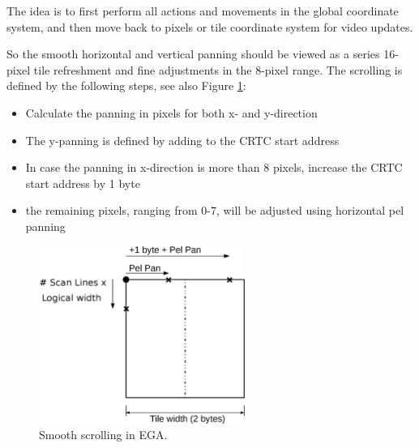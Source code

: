 \documentclass[book.tex]{subfiles}
\begin{document}
The idea is to first perform all actions and movements in the global coordinate system, and then move back to pixels or tile coordinate system for video updates. \\
\begin{minipage}{\textwidth}
  
  \end{minipage}
  \label{ega_refresh}
  \par


So the smooth horizontal and vertical panning should be viewed as a series 16-pixel tile refreshment and fine adjustments in the 8-pixel range. The scrolling is defined by the following steps, see also Figure \ref{fig:tile_refresh}:
\begin{itemize}
  \item Calculate the panning in pixels for both x- and y-direction
  \item The y-panning is defined by adding  to the CRTC start address
  \item In case the panning in x-direction is more than 8 pixels, increase the CRTC start address by 1 byte
  \item the remaining pixels, ranging from 0-7, will be adjusted using horizontal pel panning
\end{itemize}


\begin{figure}[H]
\centering
\includegraphics[width=0.6\textwidth]{imgs/drawings/Tile_Refresh.eps}
\caption{Smooth scrolling in EGA.}
\label{fig:tile_refresh}
\end{figure}
\end{document}
